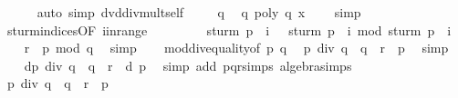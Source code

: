 \begin{isabellebody}
\ \ \ \ \isamarkupfalse%
\ {\isacharparenleft}auto\ simp{\isacharcolon}\ dvd{\isacharunderscore}div{\isacharunderscore}mult{\isacharunderscore}self{\isacharparenright}\ \isanewline
\ \ \isamarkupfalse%
\ q{\isacharunderscore}{}\ \isamarkupfalse%
\ q{\isacharprime}{\isacharunderscore}{}{\isacharcolon}\ {\isachardoublequoteopen}poly\ {\isacharquery}q{\isacharprime}\ x\ {\isacharequal}\ {}{\isachardoublequoteclose}\ \isamarkupfalse%
\ simp\isanewline
\ \ \isamarkupfalse%
\ sturm{\isacharunderscore}indices{\isacharbrackleft}OF\ i{\isacharunderscore}in{\isacharunderscore}range{\isacharprime}{\isacharbrackright}\ \isanewline
\ \ \ \ \ \ \isamarkupfalse%
\ {\isachardoublequoteopen}sturm\ p\ {\isacharbang}\ {\isacharparenleft}i{\isacharplus}{}{\isacharparenright}\ {\isacharequal}\ {\isacharminus}\ {\isacharparenleft}sturm\ p\ {\isacharbang}\ i\ mod\ sturm\ p\ {\isacharbang}\ {\isacharparenleft}i{\isacharplus}{}{\isacharparenright}{\isacharparenright}{\isachardoublequoteclose}\ \isacommand{{\isachardot}}\isamarkupfalse%
\isanewline
\ \ \isamarkupfalse%
\ {\isachardoublequoteopen}{\isacharminus}{\isacharquery}r{\isacharprime}\ {\isacharequal}\ {\isacharquery}p{\isacharprime}\ mod\ {\isacharquery}q{\isacharprime}{\isachardoublequoteclose}\ \isamarkupfalse%
\ simp\isanewline
\ \ \isamarkupfalse%
\ mod{\isacharunderscore}div{\isacharunderscore}equality{\isacharbrackleft}of\ {\isacharquery}p{\isacharprime}\ {\isacharquery}q{\isacharprime}{\isacharbrackright}\ \isamarkupfalse%
\ {\isachardoublequoteopen}{\isacharquery}p{\isacharprime}\ div\ {\isacharquery}q{\isacharprime}\ {\isacharasterisk}\ {\isacharquery}q{\isacharprime}\ {\isacharminus}\ {\isacharquery}r{\isacharprime}\ {\isacharequal}\ {\isacharquery}p{\isacharprime}{\isachardoublequoteclose}\ \isamarkupfalse%
\ simp\isanewline
\ \ \isamarkupfalse%
\ {\isachardoublequoteopen}d{\isacharasterisk}{\isacharparenleft}{\isacharquery}p\ div\ {\isacharquery}q\ {\isacharasterisk}\ {\isacharquery}q\ {\isacharminus}\ {\isacharquery}r{\isacharparenright}\ {\isacharequal}\ d{\isacharasterisk}\ {\isacharquery}p{\isachardoublequoteclose}\ \isamarkupfalse%
\ {\isacharparenleft}simp\ add{\isacharcolon}\ pqr{\isacharunderscore}simps\ algebra{\isacharunderscore}simps{\isacharparenright}\isanewline
\ \ \isamarkupfalse%
\ {\isachardoublequoteopen}{\isacharquery}p\ div\ {\isacharquery}q\ {\isacharasterisk}\ {\isacharquery}q\ {\isacharminus}\ {\isacharquery}r\ {\isacharequal}\ {\isacharquery}p{\isachardoublequoteclose}\ \isamarkupfalse%

\end{isabellebody}
